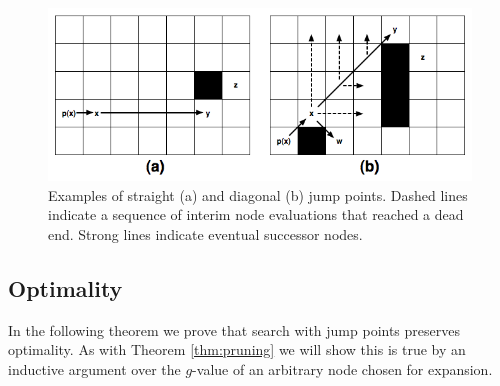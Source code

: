 \begin{figure}[tb]
       \begin{center}
		   \includegraphics[scale=0.35, trim = 10mm 10mm 10mm 0mm]
			{diagrams/jumppoints.png}
       \end{center}
	\vspace{-3pt}
       \caption{Examples of straight (a) and diagonal (b) jump points.
Dashed lines indicate a sequence of interim node evaluations that reached
a dead end. Strong lines indicate eventual successor nodes.}
       \label{fig:jumppoints}
\end{figure}

\subsection{Optimality}
In the following theorem we prove that search with jump points preserves
optimality. As with Theorem \ref{thm:pruning} we will show this is true
by an inductive argument over the $g$-value of an arbitrary node chosen
for expansion.

%
%
%
%


